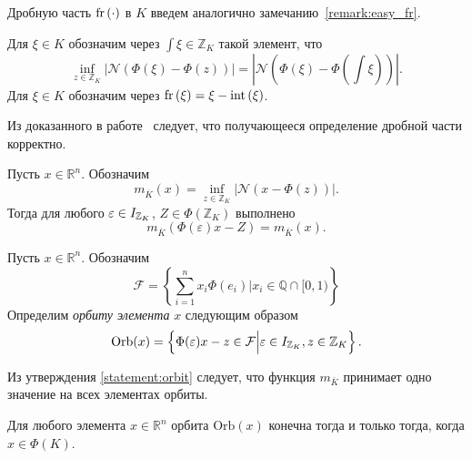 \documentclass[_00_dissertation.tex]{subfiles}
\begin{document}
Дробную часть $\textrm{fr}\left(\cdot\right)$ в $K$ введем аналогично замечанию~\ref{remark:easy_fr}.

\begin{definition}
    Для $\xi \in K$ обозначим через $\int{\xi} \in \mathbb{Z}_K$ такой элемент, что
    \begin{equation*}
        \inf\limits_{z\in\mathbb{Z}_K} |\mathcal{N}(\Phi(\xi) - \Phi(z))| = |\mathcal{N}(\Phi(\xi) - \Phi(\int{\xi}))|.
    \end{equation*}
    Для $\xi \in K$ обозначим через $\textrm{fr}\left(\xi\right) = \xi - \textrm{int}\left(\xi\right)$.
\end{definition}

Из доказанного в работе~\cite{source:Lezowski} следует, что получающееся определение дробной части корректно.

\begin{statement}\label{statement:orbit}\cite{source:Lezowski}
    Пусть $x \in \mathbb{R}^n$.
    Обозначим
    \begin{equation*}
        m_{\overline{K}}(x) = \inf_{z\in\mathbb{Z}_K} |\mathcal{N}(x - \Phi(z))|.
    \end{equation*}
    Тогда для любого $\varepsilon \in I_{\mathbb{Z}_K}$, $Z \in \Phi(\mathbb{Z}_K)$ выполнено
    \begin{equation*}
        m_{\overline{K}}(\Phi(\varepsilon)x - Z) = m_{\overline{K}}(x).
    \end{equation*}
\end{statement}

\begin{definition}
    Пусть $x\in \mathbb{R}^n$.
    Обозначим
    \begin{equation*}
        \mathcal{F} = \left\{
            \sum\limits_{i=1}^n x_i\Phi(e_i) \Big| x_i \in \mathbb{Q}\cap[0, 1)
        \right\}
    \end{equation*}
    Определим \emph{орбиту элемента} $x$ следующим образом 
    \begin{equation*}
        \textrm{Orb}(x) = \left\{
        \Phi(\varepsilon)x - z \in \mathcal{F} \Big| \varepsilon \in I_{\mathbb{Z}_K}, z \in \mathbb{Z}_K
    \right\}.
    \end{equation*}
\end{definition}

Из утверждения \ref{statement:orbit} следует, что функция $m_{\overline{K}}$ принимает одно значение на всех элементах орбиты.

\begin{statement}\cite{source:Lezowski}
    Для любого элемента $x\in \mathbb{R}^n$ орбита $\textrm{Orb}(x)$ конечна тогда и только тогда, когда $x \in \Phi(K)$.
\end{statement}
\end{document}
